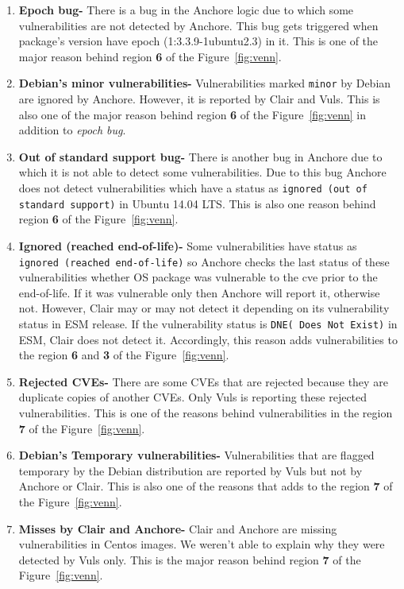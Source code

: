 \begin{enumerate}
\item\textbf{Epoch bug-} There is a bug in the Anchore logic due to which some vulnerabilities are
                not detected by Anchore. This bug gets triggered when package’s version have epoch
		(1:3.3.9-1ubuntu2.3) in it. This is one of the major reason behind region \textbf{6}
		of the Figure~\ref{fig:venn}.

\item\textbf{Debian's minor vulnerabilities-} Vulnerabilities marked \texttt{minor}
		 by Debian are ignored by Anchore. However, it is reported by Clair
		  and Vuls. This is also one of the major reason behind region \textbf{6}
		  of the Figure~\ref{fig:venn} in addition to \textit{epoch bug}.

\item\textbf{Out of standard support bug-} There is another bug in Anchore due to
                which it is not able to detect some vulnerabilities. Due to this bug Anchore does not detect
		vulnerabilities which have a status as \texttt{ignored (out of standard support)} in Ubuntu 14.04 LTS.
                This is also one reason behind region \textbf{6} of the Figure~\ref{fig:venn}.

\item\textbf{Ignored (reached end-of-life)-} Some vulnerabilities have status as \texttt{ignored (reached end-of-life)}
                so Anchore checks the last status of these vulnerabilities whether OS package was vulnerable to the cve
                prior to the end-of-life. If it was vulnerable only then Anchore will report it, otherwise not.
                However, Clair may or may not detect it depending on its vulnerability status in ESM release.
		If the vulnerability status is \texttt{DNE( Does Not Exist)} in ESM, Clair does not
		detect it.
		Accordingly, this reason adds vulnerabilities to the region \textbf{6} and \textbf{3} of the Figure~\ref{fig:venn}.

\item\textbf{Rejected CVEs-} There are some CVEs that are rejected because they are duplicate copies of another CVEs.
            Only Vuls is reporting these rejected vulnerabilities. This is one of the reasons behind
		vulnerabilities in the region \textbf{7} of the Figure~\ref{fig:venn}.

\item\textbf{Debian's Temporary vulnerabilities-} Vulnerabilities that are flagged temporary by the
            Debian distribution are reported by Vuls but not by Anchore or
		Clair. This is also one of the reasons that adds to the region \textbf{7} of the Figure~\ref{fig:venn}. 

\item\textbf{Misses by Clair and Anchore-} Clair and Anchore are missing vulnerabilities in Centos images.
	We weren’t able to explain why they were detected by Vuls only. This is the major reason behind
		region \textbf{7} of the Figure~\ref{fig:venn}.
\end{enumerate}
